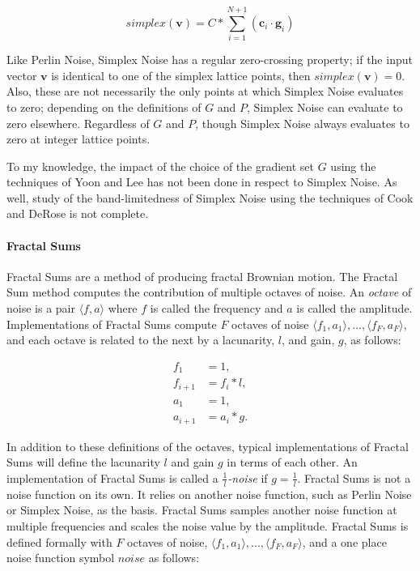 \documentclass[12pt]{article}
\theoremstyle{definition}
\theoremstyle{remark}
\begin{document}
\begin{equation*}
	simplex(\textbf{v}) = C * \sum_{i=1}^{N+1}(\textbf{c}_i \cdot \textbf{g}_i)
\end{equation*}

Like Perlin Noise, Simplex Noise has a regular zero-crossing property; if the input vector $\textbf{v}$ is identical to one of the simplex lattice points, then $simplex(\textbf{v})=0$. Also, these are not necessarily the only points at which Simplex Noise evaluates to zero; depending on the definitions of $G$ and $P$, Simplex Noise can evaluate to zero elsewhere. Regardless of $G$ and $P$, though Simplex Noise always evaluates to zero at integer lattice points.

To my knowledge, the impact of the choice of the gradient set $G$ using the techniques of Yoon and Lee has not been done in respect to Simplex Noise. As well, study of the band-limitedness of Simplex Noise using the techniques of Cook and DeRose is not complete.

\paragraph{Fractal Sums}

Fractal Sums are a method of producing fractal Brownian motion\cite{lagaeetal2010}. The Fractal Sum method computes the contribution of multiple octaves of noise. An \textit{octave} of noise is a pair $\langle f, a \rangle$ where $f$ is called the frequency and $a$ is called the amplitude. Implementations of Fractal Sums compute $F$ octaves of noise $\langle f_1, a_1 \rangle, ..., \langle f_F, a_F \rangle$, and each octave is related to the next by a lacunarity, $l$, and gain, $g$, as follows:

\begin{align*}
	f_1 &= 1, \\
	f_{i+1} &= f_i * l, \\
	a_1 &= 1, \\
	a_{i+1} &= a_i * g.
\end{align*}

In addition to these definitions of the octaves, typical implementations of Fractal Sums will define the lacunarity $l$ and gain $g$ in terms of each other. An implementation of Fractal Sums is called a $\frac{1}{l}$\textit{-noise} if $g=\frac{1}{l}$. Fractal Sums is not a noise function on its own. It relies on another noise function, such as Perlin Noise or Simplex Noise, as the basis. Fractal Sums samples another noise function at multiple frequencies and scales the noise value by the amplitude. Fractal Sums is defined formally with $F$ octaves of noise, $\langle f_1, a_1 \rangle, ..., \langle f_F, a_F \rangle$, and a one place noise function symbol $noise$ as follows:
\end{document}
